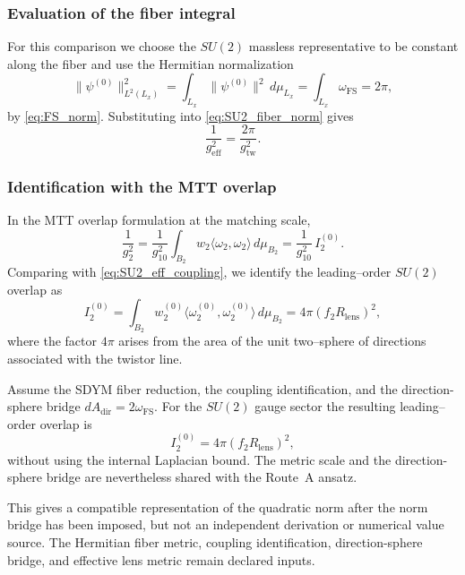 \documentclass[11pt]{article}
\begin{document}
\subsubsection{Evaluation of the fiber integral}

For this comparison we choose the $SU(2)$ massless representative to be
constant along the fiber and use the Hermitian normalization
\[
\|\psi^{(0)}\|_{L^2(L_x)}^2
=
\int_{L_x}\|\psi^{(0)}\|^2\,d\mu_{L_x}
=
\int_{L_x}\omega_{\mathrm{FS}}
=
2\pi,
\]
by \eqref{eq:FS_norm}.
Substituting into \eqref{eq:SU2_fiber_norm} gives
\begin{equation}
\frac{1}{g_{\mathrm{eff}}^2}
=
\frac{2\pi}{g_{\mathrm{tw}}^2}.
\label{eq:SU2_eff_coupling}
\end{equation}

\subsubsection{Identification with the MTT overlap}

In the MTT overlap formulation at the matching scale,
\[
\frac{1}{g_2^2}
=
\frac{1}{g_{10}^2}
\int_{B_2}w_2\langle\omega_2,\omega_2\rangle\,d\mu_{B_2}
=
\frac{1}{g_{10}^2}\,I_2^{(0)}.
\]
Comparing with \eqref{eq:SU2_eff_coupling}, we identify the leading--order
$SU(2)$ overlap as
\begin{equation}
I_2^{(0)}
=
\int_{B_2}w_2^{(0)}
\langle\omega_2^{(0)},\omega_2^{(0)}\rangle\,d\mu_{B_2}
=
4\pi (f_2R_{\mathrm{lens}})^2,
\label{eq:SU2_overlap_final}
\end{equation}
where the factor $4\pi$ arises from the area of the unit two--sphere of
directions associated with the twistor line.

\begin{theorem}
Assume the SDYM fiber reduction, the coupling identification, and the
direction-sphere bridge $dA_{\mathrm{dir}}=2\omega_{\mathrm{FS}}$. For the
$SU(2)$ gauge sector the resulting leading--order overlap is
\[
I_2^{(0)} = 4\pi (f_2R_{\mathrm{lens}})^2,
\]
without using the internal Laplacian bound. The metric scale and the
direction-sphere bridge are nevertheless shared with the Route~A ansatz.
\end{theorem}

\begin{remark}
This gives a compatible representation of the quadratic norm after the norm
bridge has been imposed, but not an independent derivation or numerical value
source. The Hermitian fiber metric, coupling identification, direction-sphere
bridge, and effective lens metric remain declared inputs.
\end{remark}
\end{document}
